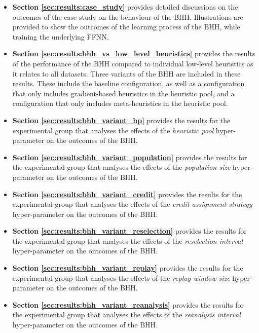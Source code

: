 \begin{itemize}
	\item \textbf{Section \ref{sec:results:case_study}} provides detailed discussions on the outcomes of the case study on the behaviour of the \acs{BHH}. Illustrations are provided to show the outcomes of the learning process of the \acs{BHH}, while training the underlying \acf{FFNN}.

	\item \textbf{Section \ref{sec:results:bhh_vs_low_level_heuristics}} provides the results of the performance of the \acs{BHH} compared to individual low-level heuristics as it relates to all datasets. Three variants of the \acs{BHH} are included in these results. These include the baseline configuration, as well as a configuration that only includes gradient-based heuristics in the heuristic pool, and a configuration that only includes meta-heuristics in the heuristic pool.

	\item \textbf{Section \ref{sec:results:bhh_variant_hp}} provides the results for the experimental group that analyses the effects of the \textit{heuristic pool} hyper-parameter on the outcomes of the \acs{BHH}.

	\item \textbf{Section \ref{sec:results:bhh_variant_population}} provides the results for the experimental group that analyses the effects of the \textit{population size} hyper-parameter on the outcomes of the \acs{BHH}.

	\item \textbf{Section \ref{sec:results:bhh_variant_credit}} provides the results for the experimental group that analyses the effects of the \textit{credit assignment strategy} hyper-parameter on the outcomes of the \acs{BHH}.

	\item \textbf{Section \ref{sec:results:bhh_variant_reselection}} provides the results for the experimental group that analyses the effects of the \textit{reselection interval} hyper-parameter on the outcomes of the \acs{BHH}.

	\item \textbf{Section \ref{sec:results:bhh_variant_replay}} provides the results for the experimental group that analyses the effects of the \textit{replay window size} hyper-parameter on the outcomes of the \acs{BHH}.

	\item \textbf{Section \ref{sec:results:bhh_variant_reanalysis}} provides the results for the experimental group that analyses the effects of the \textit{reanalysis interval} hyper-parameter on the outcomes of the \acs{BHH}.


\end{itemize}

